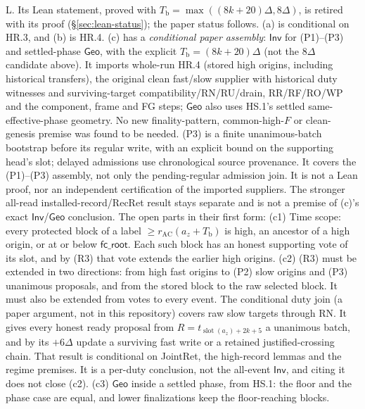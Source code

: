 \documentclass{article}
\newcommand{\slot}{\operatorname{slot}}
\newcommand{\fcroot}{\mathsf{fc\_root}}
\begin{document}
{L.  Its Lean statement, proved with $T_{\mathrm b}=\max((8k+20)\Delta,8\Delta)$,
is retired with its proof (\S\ref{sec:lean-status}); the paper status follows.
(a) is conditional on HR.3, and (b) is HR.4.  (c) has a
\emph{conditional paper assembly}: $\mathsf{Inv}$ for (P1)--(P3) and
settled-phase $\mathsf{Geo}$, with the explicit $T_{\mathrm b}=(8k+20)\Delta$
(not the $8\Delta$ candidate above).  It imports whole-run HR.4 (stored high
origins, including historical transfers), the original clean fast/slow
supplier with historical duty witnesses and surviving-target
compatibility/RN/RU/drain, RR/RF/RO/WP and the component, frame and FG steps;
$\mathsf{Geo}$ also uses HS.1's settled same-effective-phase geometry.  No new
finality-pattern, common-high-$F$ or clean-genesis premise was found to be
needed.  (P3) is a finite unanimous-batch bootstrap before its
regular write, with an explicit bound on the supporting head's slot; delayed
admissions use chronological source provenance.  It covers the (P1)--(P3)
assembly, not only the pending-regular admission join.  It is not a Lean proof, nor
an independent certification of the imported suppliers.  The stronger
all-read installed-record/RecRet result stays separate and is not a premise of
(c)'s exact $\mathsf{Inv}$/$\mathsf{Geo}$ conclusion.  The open parts in
their first form:
(c1) Time scope: every protected block of a label
$\geq r_{\mathrm{AC}}(a_z+T_{\mathrm b})$ is high, an ancestor of a high
origin, or at or below $\fcroot$.  Each such block has an honest supporting
vote of its slot, and by (R3) that vote extends the earlier high origins.
(c2) (R3) must be extended in two directions: from high fast origins to (P2)
slow origins and (P3) unanimous proposals, and from the stored block to the
raw selected block.  It must also be extended from votes to every event.
The conditional duty join (a paper argument, not in this repository) covers raw slow targets through RN.  It
gives every honest ready proposal from $R=t_{\slot(a_z)+2k+5}$ a unanimous
batch, and by its $+6\Delta$ update a surviving fast write or a retained
justified-crossing chain.  That result is conditional on JointRet, the
high-record lemmas and the regime premises.  It is a per-duty conclusion,
not the all-event $\mathsf{Inv}$, and citing it does not close (c2).
(c3) $\mathsf{Geo}$ inside a settled phase, from HS.1: the floor and the
phase case are equal, and lower finalizations keep the floor-reaching
blocks.}
\end{document}
